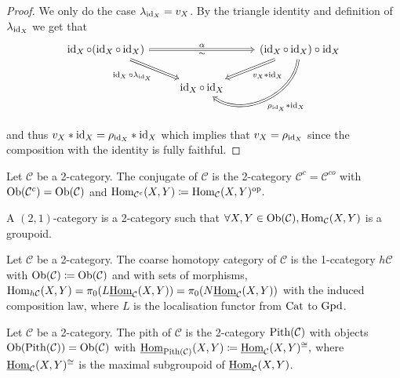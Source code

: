 \begin{proof}
	We only do the case $ \lambda_{\operatorname{id}_X}= v_X $.
	By the triangle identity and definition of $ \lambda_{ \operatorname{id}_X} $
	we get that 
	\[
	\begin{tikzcd}	
		\id_X \circ ( \id_X \circ \id_X )
		\ar[rr, Rightarrow, "\alpha", "\sim"']
		\ar[rd, Rightarrow, "\id_X \circ \lambda_{ \id_X}"']
		&&
		(\id_X \circ \id_X ) \circ \id_X
		\ar[dl, Rightarrow," v_X * \id_X"]
		\ar[dl, Rightarrow, bend left=60, " \rho_{\id_X} * \id_X"]
		\\
		&
		\id_X \circ \id_X
	\end{tikzcd}	
	\]
	and thus $ v_X * \operatorname{id}_X = \rho_{\operatorname{id}_X} * \operatorname{id}_X$ which implies that $v_X = \rho_{ \operatorname{id}_X}$ since the composition with the identity is fully faithful.
\end{proof}

\begin{defi}
	Let $\mathcal{ C }$ be a 2-category. The conjugate of $\mathcal{ C } $ is the 2-category $ \mathcal{C}^c = \mathcal{ C }^{co} $ with $\operatorname{Ob}( \mathcal{ C }^c ) = \operatorname{Ob} ( \mathcal{ C } )$ and $ \operatorname{Hom}_{ \mathcal{ C }^c} ( X , Y ) \coloneqq \operatorname{Hom}_{ \mathcal{ C } } ( X , Y )^{ \operatorname{op}}.$
\end{defi}

\begin{defi}
	A $ ( 2 ,1 )$-category is a 2-category such that $ \forall X, Y \in \operatorname{Ob} ( \mathcal{ C } ), \operatorname{Hom}_{ \mathcal{ C } } (X , Y) $ is a groupoid.
\end{defi}

\begin{defi}
	Let $ \mathcal{ C } $ be a 2-category. The coarse homotopy category of $\mathcal{C}$ is the 1-ccategory $h\mathcal{C}$ with $\operatorname{Ob} ( \mathcal{C } ) \coloneqq \operatorname{Ob}(\mathcal{ C } ) $ and with sets of morphisms, $ \operatorname{Hom}_{ h \mathcal{ C } }  ( X , Y ) = \pi_0 ( L \underline{ \operatorname{Hom} }_{ \mathcal{ C } } ( X , Y )) = \pi_0 ( N \underline{\operatorname{Hom}}_{\mathcal{ C } }( X , Y ))$ with the induced composition law, where $L$  is the localisation functor from $ \operatorname{Cat} $ to $\operatorname{Gpd}$.
\end{defi}

\begin{defi}
	Let $\mathcal{ C }$ be a 2-category.
	The pith of $ \mathcal{ C } $ is the 2-category $ \operatorname{Pith} ( \mathcal{ C } )$ with objects $ \operatorname{Ob} ( \operatorname{Pith} ( \mathcal{ C } ) )=\operatorname{Ob} ( \mathcal{ C } )$ with $\underline{ \operatorname{Hom} }_{ \operatorname{Pith} ( \mathcal{ C } ) } ( X, Y ) \coloneqq \underline{\operatorname{Hom}}_{ \mathcal{ C } } ( X , Y )^{ \cong } , $ where $ \underline{\operatorname{Hom}}_{ \mathcal{ C } } ( X , Y )^{ \cong } $ is the maximal subgroupoid of $\underline{\operatorname{Hom}}_{ \mathcal{ C } } ( X , Y ) $.
\end{defi}

